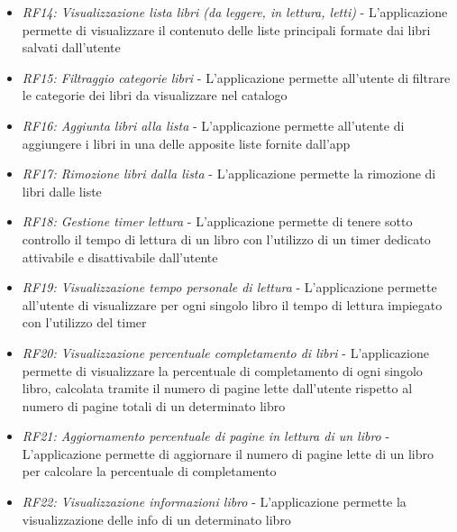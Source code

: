 \documentclass{article}
\begin{document}
\begin{itemize}
\begin{itemize}
        \item \textit{RF14: Visualizzazione lista libri (da leggere, in lettura, letti)} - L'applicazione permette di visualizzare il contenuto delle liste principali formate dai libri salvati dall'utente
        \item \textit{RF15: Filtraggio categorie libri} - L'applicazione permette all'utente di filtrare le categorie dei libri da visualizzare nel catalogo 
        \item \textit{RF16: Aggiunta libri alla lista} - L'applicazione permette all'utente di aggiungere i libri in una delle apposite liste fornite dall'app
        \item \textit{RF17: Rimozione libri dalla lista} - L'applicazione permette la rimozione di libri dalle liste
        \item \textit{RF18: Gestione timer lettura} - L'applicazione permette di tenere sotto controllo il tempo di lettura di un libro con l'utilizzo di un timer dedicato attivabile e disattivabile dall'utente
        \item \textit{RF19: Visualizzazione tempo personale di lettura} - L'applicazione permette all'utente di visualizzare per ogni singolo libro il tempo di lettura impiegato con l'utilizzo del timer
        \item \textit{RF20: Visualizzazione percentuale completamento di libri} - L'applicazione permette di visualizzare la percentuale di completamento di ogni singolo libro, calcolata tramite il numero di pagine lette dall'utente rispetto al numero di pagine totali di un determinato libro
        \item \textit{RF21: Aggiornamento percentuale di pagine in lettura di un libro} - L'applicazione permette di aggiornare il numero di pagine lette di un libro per calcolare la percentuale di completamento
        \item \textit{RF22: Visualizzazione informazioni libro} - L'applicazione permette la visualizzazione delle info di un determinato libro 
    \end{itemize}
\end{itemize}
\end{document}
